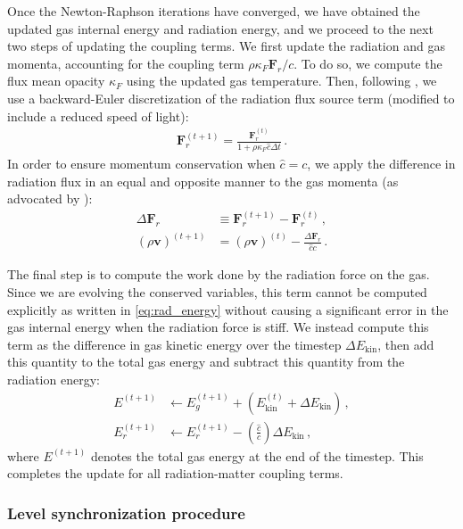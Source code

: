 \documentclass[fleqn,usenatbib]{mnras}
\newcommand{\vc}[1]{{\mathbf{#1}}}
\begin{document}
Once the Newton-Raphson iterations have converged, we have obtained the updated gas internal energy and radiation energy, and we proceed to the next two steps of updating the coupling terms. We first update the radiation and gas momenta, accounting for the coupling term $\rho \kappa_F \mathbf{F}_r/c$. To do so, we compute the flux mean opacity $\kappa_F$ using the updated gas temperature. Then, following \cite{Skinner_2019}, we use a backward-Euler discretization of the radiation flux source term (modified to include a reduced speed of light):
\begin{align}
\vc{F}_r^{(t+1)} = \frac{\vc{F}_r^{(t)}}{1 + \rho \kappa_F \hat c \Delta t} \, .
\end{align}
In order to ensure momentum conservation when $\hat c = c$, we apply the difference in radiation flux in an equal and opposite manner to the gas momenta (as advocated by \citealt{Skinner_2019}):
\begin{align}
\Delta \vc{F}_r &\equiv \vc{F}_r^{(t+1)} - \vc{F}_r^{(t)} \, , \\
{(\rho \vc{v})}^{(t+1)} &= {(\rho \vc{v})}^{(t)} - \frac{\Delta \vc{F}_r}{\hat c c} \, .
\end{align}

The final step is to compute the work done by the radiation force on the gas. Since we are evolving the conserved variables, this term cannot be computed explicitly as written in \autoref{eq:rad_energy} without causing a significant error in the gas internal energy when the radiation force is stiff. We instead compute this term as the difference in gas kinetic energy over the timestep $\Delta E_{\text{kin}}$, then add this quantity to the total gas energy and subtract this quantity from the radiation energy:
\begin{align}
E^{(t+1)} &\leftarrow E_g^{(t+1)} + \left( E_{\text{kin}}^{(t)} + \Delta E_{\text{kin}} \right) \, , \\
E_r^{(t+1)} &\leftarrow E_r^{(t+1)} - \left( \frac{\hat c}{c} \right) \Delta E_{\text{kin}} \, ,
\end{align}
where $E^{(t+1)}$ denotes the total gas energy at the end of the timestep. This completes the update for all radiation-matter coupling terms.


\subsubsection{Level synchronization procedure}
\label{sssec:sync}
\end{document}
